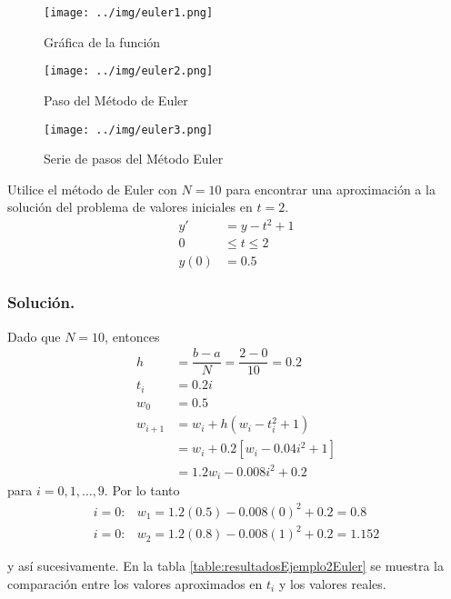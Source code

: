 \begin{figure}[H]
  \centering
  \texttt{[image: ../img/euler1.png]}
  \caption{Gráfica de la función}
  \label{fig:funcionEuler}
\end{figure}

\begin{figure}[H]
  \centering
  \texttt{[image: ../img/euler2.png]}
  \caption{Paso del Método de Euler}
  \label{fig:pasoMetodoEuler}
\end{figure}

\begin{figure}[H]
  \centering
  \texttt{[image: ../img/euler3.png]}
  \caption{Serie de pasos del Método Euler}
  \label{fig:seriePasosMetodoEuler}
\end{figure}


\begin{exerciseT}{\rm Utilice el método de Euler con $N=10$ para encontrar una aproximación a la solución del problema
de valores iniciales en $t=2$. 
\begin{align*}
	y' &= y - t^2 +1\\
	0&\leq t\leq 2\\
	y(0) &= 0.5
\end{align*}

\subsubsection*{Solución.}
Dado que $N=10$, entonces
\begin{align*}
	h &= \dfrac{b-a}{N} = \dfrac{2-0}{10} = 0.2 \\
	t_i &= 0.2i \\
	w_0 &= 0.5\\
	w_{i+1} &= w_i + h(w_i - t_i^2 + 1)\\ 
		&= w_i + 0.2[w_i - 0.04i^2 + 1]\\ 
		&= 1.2w_i - 0.008i^2 + 0.2
\end{align*}
para $i=0,1,\dots,9$. Por lo tanto
\[\begin{array}{ll}
	\mbox{$i=0: $} & w_1 = 1.2(0.5) - 0.008(0)^2 + 0.2 = 0.8 \\
	\mbox{$i=0: $} & w_2 = 1.2(0.8) - 0.008(1)^2 + 0.2 = 1.152
\end{array}\]


y así sucesivamente. En la tabla \ref{table:resultadosEjemplo2Euler} se muestra la comparación entre los valores aproximados en 
$t_i$ y los valores reales.

}
\end{exerciseT}

